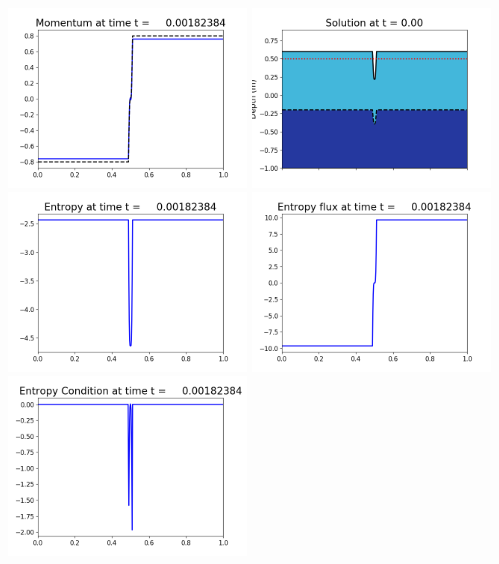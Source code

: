\documentclass[11pt]{article}
\begin{document}
\vskip 10pt 
\includegraphics[width=0.475\textwidth]{frame0006fig1003.png}
\includegraphics[width=0.475\textwidth]{frame0006fig1006.png}
\vskip 10pt 
\includegraphics[width=0.475\textwidth]{frame0006fig1007.png}
\includegraphics[width=0.475\textwidth]{frame0006fig1008.png}
\vskip 10pt 
\includegraphics[width=0.475\textwidth]{frame0006fig1009.png}
\end{document}
